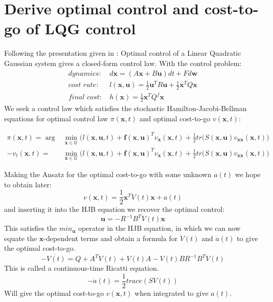 \documentclass[11pt]{article} %
\begin{document}
\section{Derive optimal control and cost-to-go of LQG control}
Following the presentation given in \cite{todorov2006optimal}: Optimal control of a Linear Quadratic Gaussian system gives a closed-form control law. With the control problem:
\begin{align}
\textit{dynamics: } &d\mathbf{x} = (A\mathbf{x} + B\mathbf{u})dt + Fd\mathbf{w} \\
\textit{cost rate: } &l(\mathbf{x}, \mathbf{u}) = \frac{1}{2}\mathbf{u}^{T}R\mathbf{u} + \frac{1}{2}\mathbf{x}^{T}Q\mathbf{x} \\
\textit{final cost: } &h(\mathbf{x}) = \frac{1}{2}\mathbf{x}^{T}Q^{f}\mathbf{x}
\end{align}
We seek a control law which satisfies the stochastic Hamilton-Jacobi-Bellman equations for optimal control law $\pi(\mathbf{x}, t)$ and optimal cost-to-go $v(\mathbf{x}, t)$:

\begin{align}
\pi(\mathbf{x}, t) = \arg &\min_{\mathbf{x} \in \mathcal{U}} \Big( l(\mathbf{x}, \mathbf{u}, t) +\mathbf{f}(\mathbf{x}, \mathbf{u})^{T}v_{\mathbf{x}}(\mathbf{x}, t) + \frac{1}{2}tr(S(\mathbf{x}, \mathbf{u})v_{\mathbf{xx}}(\mathbf{x}, t)\Big)  \\
-v_{t}(\mathbf{x}, t) = &\min_{\mathbf{x} \in \mathcal{U}} \Big( l(\mathbf{x}, \mathbf{u}, t) +\mathbf{f}(\mathbf{x}, \mathbf{u})^{T}v_{\mathbf{x}}(\mathbf{x}, t) + \frac{1}{2}tr(S(\mathbf{x}, \mathbf{u})v_{\mathbf{xx}}(\mathbf{x}, t)\Big)
\end{align}

Making the Ansatz for the optimal cost-to-go with some unknown $a(t)$ we hope to obtain later:
\begin{equation}
v(\mathbf{x}, t) = \frac{1}{2}\mathbf{x}^{T}V(t)\mathbf{x} + a(t)
\end{equation}
and inserting it into the HJB equation we recover the optimal control:
\begin{equation}
\mathbf{u} = -R^{-1}B^{T}V(t)\mathbf{x}
\end{equation}
This satisfies the $min_{\mathbf{u}}$ operator in the HJB equation, in which we can now equate the $\mathbf{x}$-dependent terms and obtain a formula for $\dot{V}(t)$ and $\dot{a}(t)$ to give the optimal cost-to-go.
\begin{equation}
-\dot{V(t)} = Q + A^{T}V(t) + V(t)A - V(t)BR^{-1}B^{T}V(t)
\end{equation}
This is called a continuous-time Ricatti equation.
\begin{equation}
-\dot{a}(t) = \frac{1}{2}trace(SV(t))
\end{equation}
Will give the optimal cost-to-go $v(\mathbf{x}, t)$ when integrated to give $a(t)$.
\end{document}
